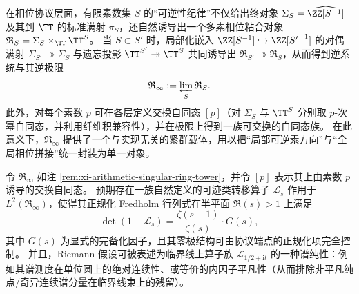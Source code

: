 \begin{remark}\label{rem:xi-arithmetic-singular-ring-tower}
在相位协议层面，有限素数集 \(S\) 的“可逆性纪律”不仅给出终对象 \(\Sigma_S=\widehat{\ZZ[S^{-1}]}\) 及其到 \(\TT\) 的标准满射 \(\pi_S\)，还自然诱导出一个多素相位粘合对象 \(\mathfrak{R}_S=\Sigma_S\times_{\TT}\TT^{S}\)。
当 \(S\subset S'\) 时，局部化嵌入 \(\ZZ[S^{-1}]\hookrightarrow \ZZ[{S'}^{-1}]\) 的对偶满射 \(\Sigma_{S'}\twoheadrightarrow \Sigma_S\) 与遗忘投影 \(\TT^{S'}\twoheadrightarrow \TT^{S}\) 共同诱导出 \(\mathfrak{R}_{S'}\twoheadrightarrow \mathfrak{R}_{S}\)，从而得到逆系统与其逆极限
\[
\mathfrak{R}_\infty:=\varprojlim_{S}\mathfrak{R}_S.
\]
此外，对每个素数 \(p\) 可在各层定义交换自同态 \([p]\)（对 \(\Sigma_S\) 与 \(\TT^{S}\) 分别取 \(p\)-次幂自同态，并利用纤维积兼容性），并在极限上得到一族可交换的自同态族。
在此意义下，\(\mathfrak{R}_\infty\) 提供了一个与实现无关的紧群载体，用以把“局部可逆素方向”与“全局相位拼接”统一封装为单一对象。
\end{remark}

\begin{conjecture}[算术奇异环塔的转移算子与谱纯性判据]\label{conj:xi-arithmetic-singular-ring-transfer-operator}
令 \(\mathfrak{R}_\infty\) 如注 \ref{rem:xi-arithmetic-singular-ring-tower}，并令 \([p]\) 表示其上由素数 \(p\) 诱导的交换自同态。
预期存在一族自然定义的可迹类转移算子 \(\mathcal{L}_s\) 作用于 \(L^2(\mathfrak{R}_\infty)\)，使得其正规化 Fredholm 行列式在半平面 \(\Re(s)>1\) 上满足
\[
\det(1-\mathcal{L}_s)=\frac{\zeta(s-1)}{\zeta(s)}\cdot G(s),
\]
其中 \(G(s)\) 为显式的完备化因子，且其零极结构可由协议端点的正规化项完全控制。
并且，Riemann 假设可被表述为临界线上算子族 \(\mathcal{L}_{1/2+\mathrm{i}t}\) 的一种谱纯性：例如其谱测度在单位圆上的绝对连续性、或等价的内因子平凡性（从而排除非平凡纯点/奇异连续谱分量在临界线束上的残留）。
\end{conjecture}

\endinput

